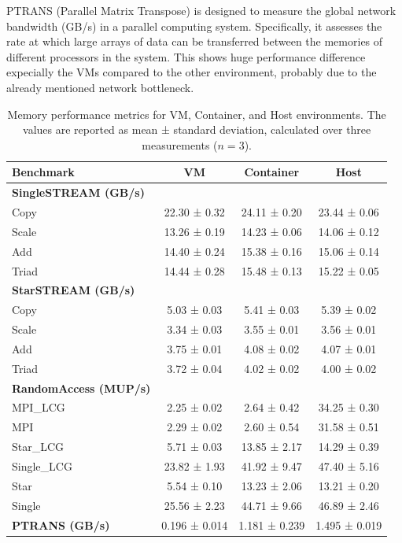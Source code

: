 PTRANS (Parallel Matrix Transpose) is designed to measure the global network bandwidth (GB/s) in a parallel computing system. Specifically, it assesses the rate at which large arrays of data can be transferred between the memories of different processors in the system.
This shows huge performance difference expecially the VMs compared to the other environment, probably due to the already mentioned network bottleneck.



\begin{table}[H]
\centering
\renewcommand{\arraystretch}{1.2}
\begin{tabular}{lccc}
\toprule
\textbf{Benchmark} & \textbf{VM} & \textbf{Container} & \textbf{Host} \\
\midrule
\textbf{SingleSTREAM (GB/s)} & & & \\
Copy   & 22.30 ± 0.32 & 24.11 ± 0.20 & 23.44 ± 0.06 \\
Scale  & 13.26 ± 0.19 & 14.23 ± 0.06 & 14.06 ± 0.12 \\
Add    & 14.40 ± 0.24 & 15.38 ± 0.16 & 15.06 ± 0.14 \\
Triad  & 14.44 ± 0.28 & 15.48 ± 0.13 & 15.22 ± 0.05 \\
\midrule
\textbf{StarSTREAM (GB/s)} & & & \\
Copy   & 5.03 ± 0.03 & 5.41 ± 0.03 & 5.39 ± 0.02 \\
Scale  & 3.34 ± 0.03 & 3.55 ± 0.01 & 3.56 ± 0.01 \\
Add    & 3.75 ± 0.01 & 4.08 ± 0.02 & 4.07 ± 0.01 \\
Triad  & 3.72 ± 0.04 & 4.02 ± 0.02 & 4.00 ± 0.02 \\
\midrule
\textbf{RandomAccess (MUP/s)} & & & \\
MPI\_LCG     & 2.25 ± 0.02 & 2.64 ± 0.42 & 34.25 ± 0.30 \\
MPI          & 2.29 ± 0.02 & 2.60 ± 0.54 & 31.58 ± 0.51 \\
Star\_LCG    & 5.71 ± 0.03 & 13.85 ± 2.17 & 14.29 ± 0.39 \\
Single\_LCG  & 23.82 ± 1.93 & 41.92 ± 9.47 & 47.40 ± 5.16 \\
Star         & 5.54 ± 0.10 & 13.23 ± 2.06 & 13.21 ± 0.20 \\
Single       & 25.56 ± 2.23 & 44.71 ± 9.66 & 46.89 ± 2.46 \\
\midrule
\textbf{PTRANS (GB/s)} & 0.196 ± 0.014 & 1.181 ± 0.239 & 1.495 ± 0.019 \\
\bottomrule
\end{tabular}
\caption{Memory performance metrics for VM, Container, and Host environments. The values are reported as mean ± standard deviation, calculated over three measurements ($n = 3$).}
\end{table}


